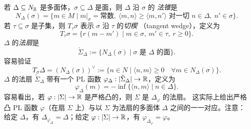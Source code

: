 \begin{definition}
若 $\Delta\subseteq N_{\mathbb{R}}$ 是多面体，$\sigma\subseteq\Delta$ 是面，则 $\Delta$ 沿 $\sigma$ 的
\emph{法锥}是
\[
  N_\Delta(\sigma)=\{m\in M \mid m|_\sigma=\text{常数},\
  \langle m,n\rangle\ge\langle m,n'\rangle\text{ 对一切 }n\in\Delta,\ n'\in\sigma\}.
\]
若 $\tau\subseteq\sigma$ 是子集，则 $T_\tau\sigma$ 表示 $\sigma$ 沿 $\tau$ 的\emph{切楔}
（tangent wedge），定义为
\[
  T_\tau\sigma=\{r(m-m') \mid m\in\sigma,\ m'\in\tau,\ r\ge 0\}.
\]
$\Delta$ 的\emph{法扇}是
\[
  \check\Sigma_\Delta:=\{N_\Delta(\sigma) \mid \sigma\text{ 是 }\Delta\text{ 的面}\}.
\]
容易验证
\begin{equation}
  T_\sigma\Delta=(N_\Delta(\sigma))^\vee:=\{n\in N \mid \langle n,m\rangle\ge 0
  \quad \forall m\in N_\Delta(\sigma)\}. \tag{1.3}
\end{equation}
$\Delta$ 的法扇 $\check\Sigma_\Delta$ 带有一个 PL 函数
$\varphi_\Delta:|\check\Sigma_\Delta|\to\mathbb{R}$，定义为
\[
  \varphi_\Delta(m)=-\inf\{\langle n,m\rangle \mid n\in\Delta\}.
\]
容易看出，若 $\varphi:|\Sigma|\to\mathbb{R}$ 是严格凸的，则 $\Sigma$ 是 $\Delta_\varphi$ 的法扇。
这实际上给出严格凸 PL 函数 $\varphi$（在扇 $\Sigma$ 上）与以 $\Sigma$ 为法扇的多面体 $\Delta$
之间的一一对应。注意：给定 $\Delta$，有 $\Delta_{\varphi_\Delta}=\Delta$；给定
$\varphi:|\Sigma|\to\mathbb{R}$，有 $\varphi_{\Delta_\varphi}=\varphi$。
\end{definition}


